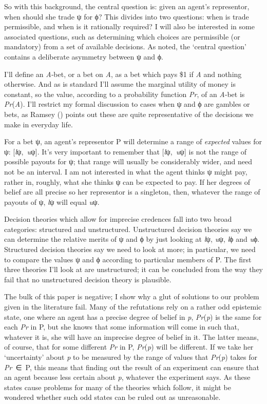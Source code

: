 \documentclass[
  10pt,
  letterpaper,
  DIV=11,
  numbers=noendperiod,
  twoside]{scrartcl}
\begin{document}
So with this background, the central question is: given an agent's
representor, when should she trade ψ for ϕ? This divides into two
questions: when is trade permissible, and when is it rationally
required? I will also be interested in some associated questions, such
as determining which choices are permissible (or mandatory) from a set
of available decisions. As noted, the `central question' contains a
deliberate asymmetry between ψ and ϕ.

I'll define an \emph{A}‑bet, or a bet on \emph{A}, as a bet which pays
\$1 if \emph{A} and nothing otherwise. And as is standard I'll assume
the marginal utility of money is constant, so the value, according to a
probability function \emph{Pr}, of an \emph{A}‑bet is
\emph{Pr}(\emph{A}). I'll restrict my formal discussion to cases when ψ
and ϕ are gambles or bets, as Ramsey
() points out these are quite
representative of the decisions we make in everyday life.

For a bet ψ, an agent's representor P will determine a range of
\emph{expected} values for ψ: {[}\emph{l}ψ,~\emph{u}ψ{]}. It's very
important to remember that {[}\emph{l}ψ,~\emph{u}ψ{]} is not the range
of possible payouts for ψ; that range will usually be considerably
wider, and need not be an interval. I am not interested in what the
agent thinks ψ might pay, rather in, roughly, what she thinks ψ can be
expected to pay. If her degrees of belief are all precise so her
representor is a singleton, then, whatever the range of payouts of ψ,
\emph{l}ψ will equal \emph{u}ψ.

Decision theories which allow for imprecise credences fall into two
broad categories: structured and unstructured. Unstructured decision
theories say we can determine the relative merits of ψ and ϕ by just
looking at \emph{l}ψ, \emph{u}ψ, \emph{l}ϕ and \emph{u}ϕ. Structured
decision theories say we need to look at more; in particular, we need to
compare the values ψ and ϕ according to particular members of P. The
first three theories I'll look at are unstructured; it can be concluded
from the way they fail that no unstructured decision theory is
plausible.

The bulk of this paper is negative; I show why a glut of solutions to
our problem given in the literature fail. Many of the refutations rely
on a rather odd epistemic state, one where an agent has a precise degree
of belief in \emph{p}, \emph{Pr}(\emph{p}) is the same for each
\emph{Pr} in P, but she knows that some information will come in such
that, whatever it is, she will have an imprecise degree of belief in it.
The latter means, of course, that for some different \emph{Pr} in P,
\emph{Pr}(\emph{p}) will be different. If we take her `uncertainty'
about \emph{p} to be measured by the range of values that
\emph{Pr}(\emph{p}) takes for \emph{Pr}~∈~P, this means that finding out
the result of an experiment can ensure that an agent because less
certain about \emph{p}, whatever the experiment says. As these states
cause problems for many of the theories which follow, it might be
wondered whether such odd states can be ruled out as unreasonable.
\end{document}
